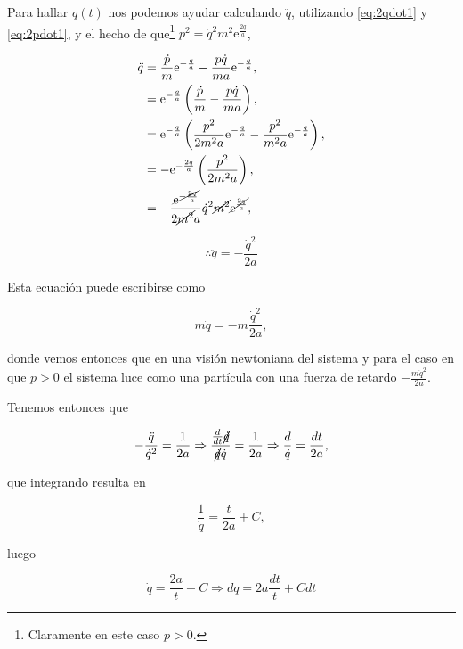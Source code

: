 \documentclass[a4paper,10pt]{article}
\numberwithin{equation}{section}
\newcommand{\euler}{\mathrm{e}}
\begin{document}
Para hallar $q(t)$ nos podemos ayudar calculando $\ddot{q}$, utilizando 
\eqref{eq:2qdot1} y \eqref{eq:2pdot1}, y el hecho de que\footnote{Claramente en este caso $p>0$.}
$p^2 = \dot{q}^2m^2\euler^{\frac{2q}{a}}$,

\begin{align*}
 \ddot{q} &= \frac{\dot{p}}{m}\euler^{-\frac{q}{a}} - \frac{p\dot{q}}{ma}\euler^{-\frac{q}{a}}, \\
	  &= \euler^{-\frac{q}{a}}\left(\frac{\dot{p}}{m} - \frac{p\dot{q}}{ma}\right), \\
	  &= \euler^{-\frac{q}{a}}\left(\frac{p^2}{2m^2a}\euler^{-\frac{q}{a}} - 
	  \frac{p^2}{m^2a}\euler^{-\frac{q}{a}}\right), \\
	  &= - \euler^{-\frac{2q}{a}}\left(\frac{p^2}{2m^2a}\right), \\
	  &= - \frac{\cancel{\euler^{-\frac{2q}{a}}}}{2\cancel{m^2}a}\dot{q}^2\cancel{m^2}\cancel{\euler^{\frac{2q}{a}}},
\end{align*}

\begin{equation}
 \therefore \ddot{q} = - \frac{\dot{q}^2}{2a}
\end{equation}

Esta ecuación puede escribirse como

\begin{equation}
 m\ddot{q} = - m\frac{\dot{q}^2}{2a},
\end{equation}

donde vemos entonces que en una visión newtoniana del sistema y para el caso en que 
$p > 0$ el sistema luce como una partícula con una fuerza de retardo 
$-\frac{m\dot{q}^2}{2a}$.

\vspace{.3cm}

Tenemos entonces que 

\begin{equation}
- \frac{\ddot{q}}{\dot{q}^2} = \frac{1}{2a} \Rightarrow 
\frac{\frac{d}{dt}\cancel{\dot{q}}}{\cancel{\dot{q}}\dot{q}} = \frac{1}{2a} 
\Rightarrow \frac{d}{\dot{q}} = \frac{dt}{2a},
\end{equation}

que integrando resulta en

\begin{equation}
 \frac{1}{\dot{q}} = \frac{t}{2a} + C,
\end{equation}

luego 

\begin{equation}
 \dot{q} = \frac{2a}{t} + C \Rightarrow dq = 2a \frac{dt}{t} + Cdt
\end{equation}
\end{document}
